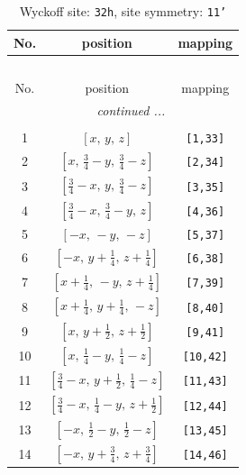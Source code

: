 \documentclass[fleqn,8pt]{jsarticle}
\begin{document}
\renewcommand{\arraystretch}{1.2}
\begin{longtable}{ccc}
\caption{Wyckoff site: {\tt 32h}, site symmetry: {\tt 11'}}
 \\
 \hline \hline
No. & position & mapping \\ \hline \endfirsthead

\multicolumn{2}{l}{\tablename\ \thetable{}} \\
 \hline \hline
No. & position & mapping \\ \hline \endhead

 \hline \hline
\multicolumn{2}{r}{\footnotesize\it continued ...} \\ \endfoot

 \hline \hline
\multicolumn{2}{r}{} \\ \endlastfoot

1 & $\left[ x,\, y,\, z \right]$ & {\tt [1,33]} \\ \hline
2 & $\left[ x,\, \frac{3}{4} - y,\, \frac{3}{4} - z \right]$ & {\tt [2,34]} \\ \hline
3 & $\left[ \frac{3}{4} - x,\, y,\, \frac{3}{4} - z \right]$ & {\tt [3,35]} \\ \hline
4 & $\left[ \frac{3}{4} - x,\, \frac{3}{4} - y,\, z \right]$ & {\tt [4,36]} \\ \hline
5 & $\left[ - x,\, - y,\, - z \right]$ & {\tt [5,37]} \\ \hline
6 & $\left[ - x,\, y + \frac{1}{4},\, z + \frac{1}{4} \right]$ & {\tt [6,38]} \\ \hline
7 & $\left[ x + \frac{1}{4},\, - y,\, z + \frac{1}{4} \right]$ & {\tt [7,39]} \\ \hline
8 & $\left[ x + \frac{1}{4},\, y + \frac{1}{4},\, - z \right]$ & {\tt [8,40]} \\ \hline
9 & $\left[ x,\, y + \frac{1}{2},\, z + \frac{1}{2} \right]$ & {\tt [9,41]} \\ \hline
10 & $\left[ x,\, \frac{1}{4} - y,\, \frac{1}{4} - z \right]$ & {\tt [10,42]} \\ \hline
11 & $\left[ \frac{3}{4} - x,\, y + \frac{1}{2},\, \frac{1}{4} - z \right]$ & {\tt [11,43]} \\ \hline
12 & $\left[ \frac{3}{4} - x,\, \frac{1}{4} - y,\, z + \frac{1}{2} \right]$ & {\tt [12,44]} \\ \hline
13 & $\left[ - x,\, \frac{1}{2} - y,\, \frac{1}{2} - z \right]$ & {\tt [13,45]} \\ \hline
14 & $\left[ - x,\, y + \frac{3}{4},\, z + \frac{3}{4} \right]$ & {\tt [14,46]} \\ \hline

\end{longtable}
\end{document}
